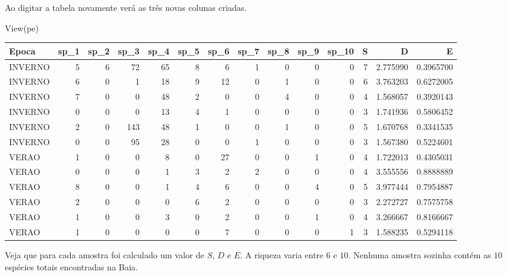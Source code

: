 \documentclass[
]{book}
\newenvironment{Shaded}{\begin{snugshade}}{\end{snugshade}}
\newcommand{\FunctionTok}[1]{\textcolor[rgb]{0.00,0.00,0.00}{#1}}
\newcommand{\NormalTok}[1]{#1}
\begin{document}
Ao digitar a tabela novamente verá as três novas colunas criadas.

\begin{Shaded}
\begin{Highlighting}[]
\FunctionTok{View}\NormalTok{(pe)}
\end{Highlighting}
\end{Shaded}

\begin{table}
\centering\begingroup\fontsize{10}{12}\selectfont

\begin{tabular}{l|r|r|r|r|r|r|r|r|r|r|r|r|r}
\hline
Epoca & sp\_1 & sp\_2 & sp\_3 & sp\_4 & sp\_5 & sp\_6 & sp\_7 & sp\_8 & sp\_9 & sp\_10 & S & D & E\\
\hline
INVERNO & 5 & 6 & 72 & 65 & 8 & 6 & 1 & 0 & 0 & 0 & 7 & 2.775990 & 0.3965700\\
\hline
INVERNO & 6 & 0 & 1 & 18 & 9 & 12 & 0 & 1 & 0 & 0 & 6 & 3.763203 & 0.6272005\\
\hline
INVERNO & 7 & 0 & 0 & 48 & 2 & 0 & 0 & 4 & 0 & 0 & 4 & 1.568057 & 0.3920143\\
\hline
INVERNO & 0 & 0 & 0 & 13 & 4 & 1 & 0 & 0 & 0 & 0 & 3 & 1.741936 & 0.5806452\\
\hline
INVERNO & 2 & 0 & 143 & 48 & 1 & 0 & 0 & 1 & 0 & 0 & 5 & 1.670768 & 0.3341535\\
\hline
INVERNO & 0 & 0 & 95 & 28 & 0 & 0 & 1 & 0 & 0 & 0 & 3 & 1.567380 & 0.5224601\\
\hline
VERAO & 1 & 0 & 0 & 8 & 0 & 27 & 0 & 0 & 1 & 0 & 4 & 1.722013 & 0.4305031\\
\hline
VERAO & 0 & 0 & 0 & 1 & 3 & 2 & 2 & 0 & 0 & 0 & 4 & 3.555556 & 0.8888889\\
\hline
VERAO & 8 & 0 & 0 & 1 & 4 & 6 & 0 & 0 & 4 & 0 & 5 & 3.977444 & 0.7954887\\
\hline
VERAO & 2 & 0 & 0 & 0 & 6 & 2 & 0 & 0 & 0 & 0 & 3 & 2.272727 & 0.7575758\\
\hline
VERAO & 1 & 0 & 0 & 3 & 0 & 2 & 0 & 0 & 1 & 0 & 4 & 3.266667 & 0.8166667\\
\hline
VERAO & 1 & 0 & 0 & 0 & 0 & 7 & 0 & 0 & 0 & 1 & 3 & 1.588235 & 0.5294118\\
\hline
\end{tabular}
\endgroup{}
\end{table}

Veja que para cada amostra foi calculado um valor de \(S\), \(D\) e \(E\). A riqueza varia entre \(6\) e \(10\). Nenhuma amostra sozinha contém as \(10\) espécies totais encontradas na Baia.
\end{document}
